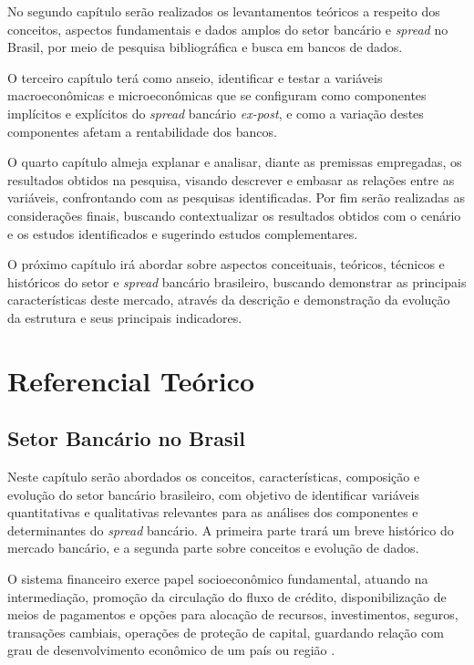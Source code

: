 \documentclass[12pt,12pt,openright,oneside,a4paper,chapter=TITLE,section=TITLE,subsection=TITLE,subsubsection=TITLE,english,french,spanish,portugues,sumario=tradicional]{abntex2}
\begin{document}
No segundo capítulo serão realizados os levantamentos teóricos a respeito dos conceitos, aspectos fundamentais e dados amplos do setor bancário e \emph{spread} no Brasil, por meio de pesquisa bibliográfica e busca em bancos de dados.

O terceiro capítulo terá como anseio, identificar e testar a variáveis macroeconômicas e microeconômicas que se configuram como componentes implícitos e explícitos do \emph{spread} bancário \emph{ex-post}, e como a variação destes componentes afetam a rentabilidade dos bancos.

O quarto capítulo almeja explanar e analisar, diante as premissas empregadas, os resultados obtidos na pesquisa, visando descrever e embasar as relações entre as variáveis, confrontando com as pesquisas identificadas. Por fim serão realizadas as considerações finais, buscando contextualizar os resultados obtidos com o cenário e os estudos identificados e sugerindo estudos complementares.

O próximo capítulo irá abordar sobre aspectos conceituais, teóricos, técnicos e históricos do setor e \emph{spread} bancário brasileiro, buscando demonstrar as principais características deste mercado, através da descrição e demonstração da evolução da estrutura e seus principais indicadores.

\textual
\pagestyle{simple}

\chapter{Referencial Teórico}

\section{Setor Bancário no Brasil}

Neste capítulo serão abordados os conceitos, características, composição e
evolução do setor bancário brasileiro, com objetivo de identificar variáveis
quantitativas e qualitativas relevantes para as análises dos componentes e
determinantes do \emph{spread} bancário. A primeira parte trará um breve histórico do mercado bancário, e a segunda parte sobre conceitos e evolução de dados.

O sistema financeiro exerce papel socioeconômico fundamental, atuando na intermediação, promoção da circulação do fluxo de crédito, disponibilização de meios de pagamentos e opções para alocação de recursos, investimentos, seguros, transações cambiais, operações de proteção de capital, guardando relação com grau de desenvolvimento econômico de um país ou região \cite{maffili:2009}.
\end{document}
